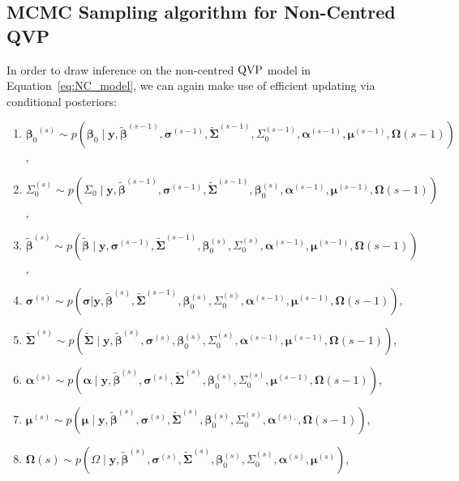 \subsection{MCMC Sampling algorithm for Non-Centred QVP}
%
In order to draw inference on the non-centred $\operatorname{QVP}$ model in Equation~\ref{eq:NC_model}, we can again make use of efficient updating via conditional posteriors: 
%
\begin{enumerate}
    \item ${\boldsymbol{\beta}_0}^{(s)} \sim p(\boldsymbol{\beta}_0\mid \boldsymbol{y},\boldsymbol{\tilde{\beta}}^{(s-1)},\boldsymbol{\sigma}^{(s-1)},\boldsymbol{\tilde{\Sigma}}^{(s-1)},\Sigma_0^{(s-1)},\boldsymbol{\alpha}^{(s-1)},\boldsymbol{\mu}^{(s-1)},\boldsymbol{\Omega}{(s-1)} )$, 
    \item $\Sigma^{(s)}_0 \sim p(\Sigma_0\mid \boldsymbol{y},\boldsymbol{\tilde{\beta}}^{(s-1)},\boldsymbol{\sigma}^{(s-1)},\boldsymbol{\tilde{\Sigma}}^{(s-1)},\boldsymbol{\beta}_0^{(s)},\boldsymbol{\alpha}^{(s-1)},\boldsymbol{\mu}^{(s-1)}, \boldsymbol{\Omega}{(s-1)})$, 
    \item ${\boldsymbol{\tilde{\beta}}}^{(s)} \sim p({\boldsymbol{\tilde{\beta}}}\mid \boldsymbol{y},\boldsymbol{\sigma}^{(s-1)},\boldsymbol{\tilde{\Sigma}}^{(s-1)},\boldsymbol{{\beta}}_0^{(s)},\Sigma_0^{(s)},\boldsymbol{\alpha}^{(s-1)},\boldsymbol{\mu}^{(s-1)},\boldsymbol{\Omega}{(s-1)} )$, 
    \item $\boldsymbol{\sigma}^{(s)} \sim p(\boldsymbol{\sigma} | \boldsymbol{y},\boldsymbol{\tilde{\beta}}^{(s)},\boldsymbol{\tilde{\Sigma}}^{(s-1)},\boldsymbol{{\beta}}_0^{(s)},\Sigma_0^{(s)},\boldsymbol{\alpha}^{(s-1)},\boldsymbol{\mu}^{(s-1)},\boldsymbol{\Omega}{(s-1)} )$, 
    \item $\boldsymbol{\tilde{\Sigma}}^{(s)} \sim p(\boldsymbol{\tilde{\Sigma}}\mid \boldsymbol{y},\boldsymbol{\tilde{\beta}}^{(s)},\boldsymbol{\sigma}^{(s)},\boldsymbol{{\beta}}_0^{(s)},\Sigma_0^{(s)},\boldsymbol{\alpha}^{(s-1)},\boldsymbol{\mu}^{(s-1)}, \boldsymbol{\Omega}{(s-1)})$, 
    \item $\boldsymbol{\alpha}^{(s)} \sim p(\boldsymbol{\alpha} \mid \boldsymbol{y},\boldsymbol{\tilde{\beta}}^{(s)},\boldsymbol{\sigma}^{(s)},\boldsymbol{\tilde{\Sigma}}^{(s)},\boldsymbol{{\beta}}_0^{(s)},\Sigma_0^{(s)},\boldsymbol{\mu}^{(s-1)},\boldsymbol{\Omega}{(s-1)} )$, 
    \item $\boldsymbol{\mu}^{(s)} \sim p(\boldsymbol{\mu} \mid \boldsymbol{y},\boldsymbol{\tilde{\beta}}^{(s)},\boldsymbol{\sigma}^{(s)},\boldsymbol{\tilde{\Sigma}}^{(s)},\boldsymbol{{\beta}}_0^{(s)},\Sigma_0^{(s)},\boldsymbol{\alpha}^{(s),},\boldsymbol{\Omega}{(s-1)})$, 
    \item $\boldsymbol{\Omega}{(s)} \sim p(\Omega\mid \boldsymbol{y},\boldsymbol{\tilde{\beta}}^{(s)},\boldsymbol{\sigma}^{(s)},\boldsymbol{\tilde{\Sigma}}^{(s)},\boldsymbol{{\beta}}_0^{(s)},\Sigma_0^{(s)},\boldsymbol{\alpha}^{(s)},\boldsymbol{\mu}^{(s)} )$,
\end{enumerate}
